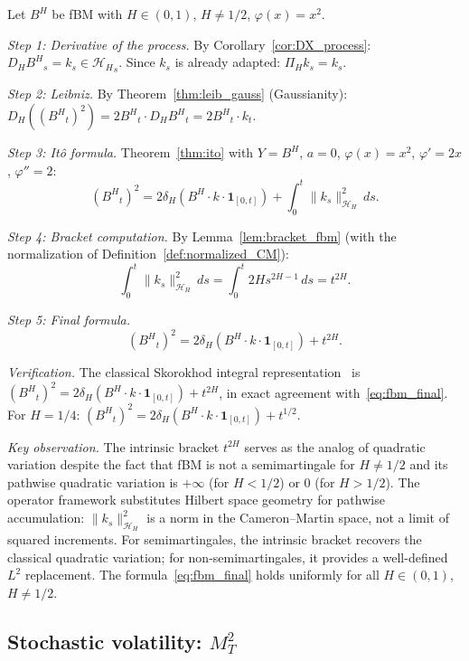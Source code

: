 \documentclass[11pt,a4paper]{article}
\theoremstyle{plain}
\theoremstyle{definition}
\theoremstyle{remark}
\newcommand{\HH}{\mathcal{H}_H}
\newcommand{\BH}{B^H}
\begin{document}
Let $\BH$ be fBM with $H \in (0,1)$, $H \neq 1/2$, $\varphi(x) = x^2$.

\emph{Step 1: Derivative of the process.} By Corollary~\ref{cor:DX_process}: $D_H{\BH}_s = k_s \in {\HH}_s$. Since $k_s$ is already adapted: $\Pi_Hk_s = k_s$.

\emph{Step 2: Leibniz.} By Theorem~\ref{thm:leib_gauss} (Gaussianity): $D_H(({\BH}_t)^2) = 2{\BH}_t\cdot D_H{\BH}_t = 2{\BH}_t\cdot k_t$.

\emph{Step 3: It\^o formula.} Theorem~\ref{thm:ito} with $Y = \BH$, $a = 0$, $\varphi(x) = x^2$, $\varphi' = 2x$, $\varphi'' = 2$:
\begin{equation}\label{eq:fbm_ito}
({\BH}_t)^2 = 2\delta_H(\BH\cdot k\cdot\mathbf{1}_{[0,t]}) + \int_0^t\|k_s\|^2_{\HH}\,ds.
\end{equation}

\emph{Step 4: Bracket computation.} By Lemma~\ref{lem:bracket_fbm} (with the normalization of Definition~\ref{def:normalized_CM}):
\[
\int_0^t\|k_s\|^2_{\HH}\,ds = \int_0^t 2Hs^{2H-1}\,ds = t^{2H}.
\]

\emph{Step 5: Final formula.}
\begin{equation}\label{eq:fbm_final}
({\BH}_t)^2 = 2\delta_H(\BH\cdot k\cdot\mathbf{1}_{[0,t]}) + t^{2H}.
\end{equation}

\emph{Verification.} The classical Skorokhod integral representation~\cite[Example 4.2]{Decreusefond1999} is $({\BH}_t)^2 = 2\delta_H(\BH\cdot k\cdot\mathbf{1}_{[0,t]})+t^{2H}$, in exact agreement with~\eqref{eq:fbm_final}. For $H = 1/4$: $({\BH}_t)^2 = 2\delta_H(\BH\cdot k\cdot\mathbf{1}_{[0,t]})+t^{1/2}$.

\emph{Key observation.} The intrinsic bracket $t^{2H}$ serves as the analog of quadratic variation despite the fact that fBM is not a semimartingale for $H \neq 1/2$ and its pathwise quadratic variation is $+\infty$ (for $H < 1/2$) or $0$ (for $H > 1/2$). The operator framework substitutes Hilbert space geometry for pathwise accumulation: $\|k_s\|^2_{\HH}$ is a norm in the Cameron--Martin space, not a limit of squared increments. For semimartingales, the intrinsic bracket recovers the classical quadratic variation; for non-semimartingales, it provides a well-defined $L^2$ replacement. The formula~\eqref{eq:fbm_final} holds uniformly for all $H \in (0,1)$, $H \neq 1/2$.


\subsection{Stochastic volatility: $M_T^2$}
\end{document}
